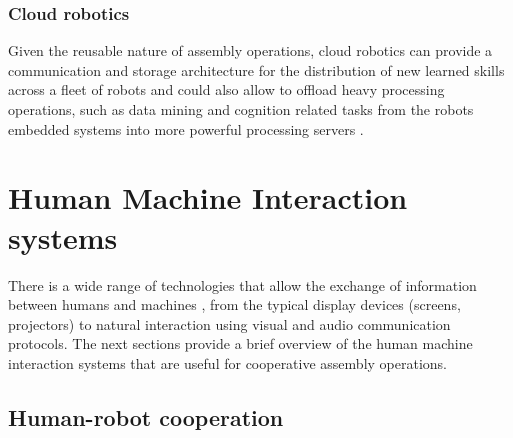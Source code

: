 \subsubsection{Cloud robotics}

Given the reusable nature of assembly operations, cloud robotics can provide a communication and storage architecture for the distribution of new learned skills across a fleet of robots \cite{Tenorth2013,Stenmark2015T} and could also allow to offload heavy processing operations, such as data mining \cite{Witten2005} and cognition related tasks \cite{Beetz2010,Tenorth2013k,Saxena2014,Beetz2015} from the robots embedded systems into more powerful processing servers \cite{Hunziker2013}.





\section{Human Machine Interaction systems}

There is a wide range of technologies that allow the exchange of information between humans and machines \cite{Goodrich2008}, from the typical display devices (screens, projectors) to natural interaction using visual and audio \cite{Yan2014} communication protocols. The next sections provide a brief overview of the human machine interaction systems that are useful for cooperative assembly operations.



\subsection{Human-robot cooperation}

